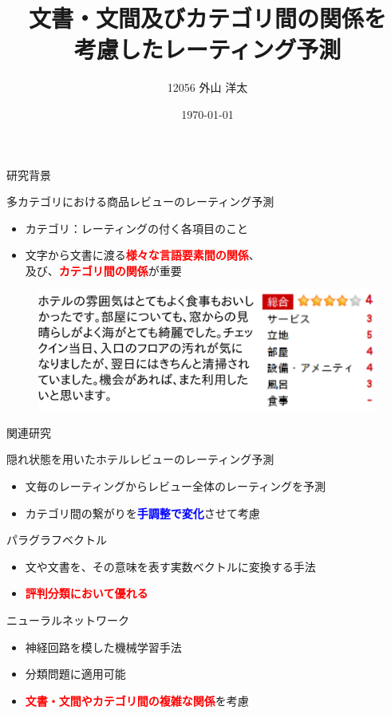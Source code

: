\documentclass[aspectratio=43,unicode,10pt]{beamer}
\title{文書・文間及びカテゴリ間の関係を\\考慮したレーティング予測}
\institute{知能数理研究室}
\author{12056 外山 洋太}
\date{\today}
\newcommand{\fire}[1]{\textcolor{red}{\textbf{#1}}}
\newcommand{\freeze}[1]{\textcolor{blue}{\textbf{#1}}}
\begin{document}
\begin{frame}
\titlepage
\end{frame}

\begin{frame}{研究背景}{}
  \begin{block}{多カテゴリにおける商品レビューのレーティング予測}
    \begin{itemize}
      \item カテゴリ：レーティングの付く各項目のこと
      \item 文字から文書に渡る\fire{様々な言語要素間の関係}、 \\
            及び、\fire{カテゴリ間の関係}が重要
    \end{itemize}
  \end{block}
  \begin{figure}
    \includegraphics[width=0.9\linewidth]{fig/review.png}
  \end{figure}
\end{frame}

\begin{frame}{関連研究}{}
  \begin{block}{隠れ状態を用いたホテルレビューのレーティング予測}
    \begin{itemize}
      \item 文毎のレーティングからレビュー全体のレーティングを予測
      \item カテゴリ間の繋がりを\freeze{手調整で変化}させて考慮
    \end{itemize}
  \end{block}
  \begin{block}{パラグラフベクトル}{}
    \begin{itemize}
      \item 文や文書を、その意味を表す実数ベクトルに変換する手法
      \item \fire{評判分類において優れる}
    \end{itemize}
  \end{block}
  \begin{block}{ニューラルネットワーク}{}
    \begin{itemize}
      \item 神経回路を模した機械学習手法
      \item 分類問題に適用可能
      \item \fire{文書・文間やカテゴリ間の複雑な関係}を考慮
    \end{itemize}
  \end{block}
\end{frame}
\end{document}
